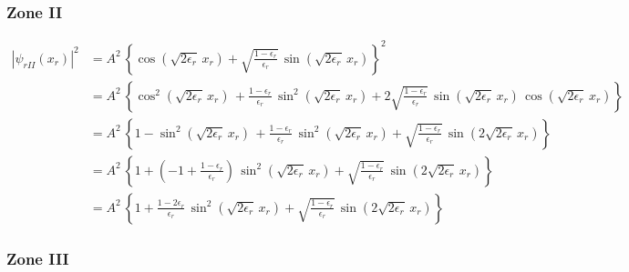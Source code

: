 \subsubsection{Zone II}
\begin{align*}
\left|\psi_{rII}(x_r)\right|^2
&= A^2\,\left\lbrace\cos\left(\sqrt{2\epsilon_r}\,x_r\right)
  + \sqrt{\frac{1-\epsilon_r}{\epsilon_r}}\,
    \sin\left(\sqrt{2\epsilon_r}\,x_r\right)
\right\rbrace^2\\
&= A^2\,\left\lbrace
 \cos^2\left(\sqrt{2\epsilon_r}\,x_r\right)\,
 + \frac{1-\epsilon_r}{\epsilon_r}\,\sin^2\left(\sqrt{2\epsilon_r}\,x_r\right)
 + 2\sqrt{\frac{1-\epsilon_r}{\epsilon_r}}\,
 \sin\left(\sqrt{2\epsilon_r}\,x_r\right)\,
 \cos\left(\sqrt{2\epsilon_r}\,x_r\right)
\right\rbrace\\
&= A^2\,\left\lbrace
 1 - \sin^2\left(\sqrt{2\epsilon_r}\,x_r\right)\,
 + \frac{1-\epsilon_r}{\epsilon_r}\,\sin^2\left(\sqrt{2\epsilon_r}\,x_r\right)
 + \sqrt{\frac{1-\epsilon_r}{\epsilon_r}}\,
 \sin\left(2\sqrt{2\epsilon_r}\,x_r\right)
\right\rbrace\\
&= A^2\,\left\lbrace
 1  
 + \left(-1+\frac{1-\epsilon_r}{\epsilon_r}\right)\,\sin^2\left(\sqrt{2\epsilon_r}\,x_r\right)
 + \sqrt{\frac{1-\epsilon_r}{\epsilon_r}}\,
 \sin\left(2\sqrt{2\epsilon_r}\,x_r\right)
\right\rbrace\\
&= A^2\,\left\lbrace
 1  
 + \frac{1-2\epsilon_r}{\epsilon_r}\,\sin^2\left(\sqrt{2\epsilon_r}\,x_r\right)
 + \sqrt{\frac{1-\epsilon_r}{\epsilon_r}}\,
 \sin\left(2\sqrt{2\epsilon_r}\,x_r\right)
\right\rbrace
\end{align*}

\subsubsection{Zone III}

